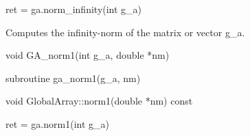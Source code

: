 \documentclass[12pt]{article}
\begin{document}
\begin{pyapi}
\begin{pycode}
ret = ga.norm_infinity(int g_a)
\end{pycode}
\begin{funcargs}
\end{funcargs}
\end{pyapi}

\gcoll

\begin{desc}
Computes the infinity-norm of the matrix or vector g_a.
\end{desc}


\begin{capi}
\begin{ccode}
void GA_norm1(int g_a, double *nm)
\end{ccode}
\begin{funcargs}
\end{funcargs}
\end{capi}

\begin{fapi}
\begin{fcode}
subroutine ga_norm1(g_a, nm)
\end{fcode}
\begin{funcargs}
\end{funcargs}
\end{fapi}

\begin{cxxapi}
\begin{cxxcode}
void GlobalArray::norm1(double *nm) const
\end{cxxcode}
\begin{funcargs}
\end{funcargs}
\end{cxxapi}

\begin{pyapi}
\begin{pycode}
ret = ga.norm1(int g_a)
\end{pycode}
\begin{funcargs}
\end{funcargs}
\end{pyapi}
\end{document}

